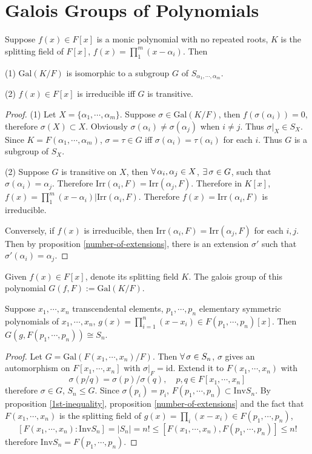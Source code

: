\section{Galois Groups of Polynomials}
\begin{proposition}
    Suppose $f(x)\in F[x]$ is a monic polynomial with no repeated roots, $K$ is the splitting field of $F[x]$, $f(x)=\prod^m_1(x-\alpha_i)$. Then
    \par (1) $\mathrm{Gal}(K/F)$ is isomorphic to a subgroup $G$ of $S_{\alpha_1,\cdots,\alpha_m}$.
    \par (2) $f(x)\in F[x]$ is irreducible iff $G$ is transitive.
\end{proposition}
\begin{proof}
    \par (1) Let $X=\{\alpha_1,\cdots,\alpha_m\}$. Suppose $\sigma\in\mathrm{Gal}(K/F)$, then $f(\sigma(\alpha_i))=0$, therefore $\sigma(X)\subset X$. Obviously $\sigma(\alpha_i)\neq\sigma(\alpha_j)$ when $i\neq j$. Thus $\sigma|_X\in S_X$. Since $K=F(\alpha_1,\cdots,\alpha_m)$, $\sigma=\tau\in G$ iff $\sigma(\alpha_i)=\tau(\alpha_i)$ for each $i$. Thus $G$ is a subgroup of $S_X$.
    \par (2) Suppose $G$ is transitive on $X$, then $\forall\,\alpha_i,\alpha_j\in X$, $\exists\,\sigma\in G$, such that $\sigma(\alpha_i)=\alpha_j$. Therefore $\mathrm{Irr}(\alpha_i,F)=\mathrm{Irr}(\alpha_j,F)$. Therefore in $K[x]$, $f(x)=\prod^m_1(x-\alpha_i)|\mathrm{Irr}(\alpha_i,F)$. Therefore $f(x)=\mathrm{Irr}(\alpha_i,F)$ is irreducible.
    \par Conversely, if $f(x)$ is irreducible, then $\mathrm{Irr}(\alpha_i,F)=\mathrm{Irr}(\alpha_j,F)$ for each $i,j$. Then by proposition \ref{number-of-extensions}, there is an extension $\sigma'$ such that $\sigma'(\alpha_i)=\alpha_j$.
\end{proof}
\begin{definition}
    Given $f(x)\in F[x]$, denote its splitting field $K$. The galois group of this polynomial $G(f,F):=\mathrm{Gal}(K/F)$.
\end{definition}
\begin{proposition}
    Suppose $x_1,\cdots,x_n$ transcendental elements, $p_1,\cdots,p_n$ elementary symmetric polynomials of $x_1,\cdots,x_n$, $g(x)=\prod^n_{i=1}(x-x_i)\in F(p_1,\cdots,p_n)[x]$. Then $G(g,F(p_1,\cdots,p_n))\cong S_n$.
\end{proposition}
\begin{proof}
    Let $G=\mathrm{Gal}(F(x_1,\cdots,x_n)/F)$. Then $\forall\,\sigma\in S_n$, $\sigma$ gives an automorphism on $F[x_1,\cdots,x_n]$ with $\sigma|_F=\mathrm{id}$. Extend it to $F(x_1,\cdots,x_n)$ with 
    $$
    \sigma(p/q)=\sigma(p)/\sigma(q),\quad p,q\in F[x_1,\cdots,x_n]
    $$
    therefore $\sigma\in G$, $S_n\le G$. Since $\sigma(p_i)=p_i$, $F(p_1,\cdots,p_n)\subset\mathrm{Inv}S_n$.
    By proposition \ref{1st-inequality}, proposition \ref{number-of-extensions} and the fact that $F(x_1,\cdots,x_n)$ is the splitting field of $g(x)=\prod_i(x-x_i)\in F(p_1,\cdots,p_n)$, 
    $$[F(x_1,\cdots,x_n):\mathrm{Inv}S_n]=|S_n|=n!\le[F(x_1,\cdots,x_n),F(p_1,\cdots,p_n)]\le n!$$
    therefore $\mathrm{Inv}S_n=F(p_1,\cdots,p_n)$.
\end{proof}
